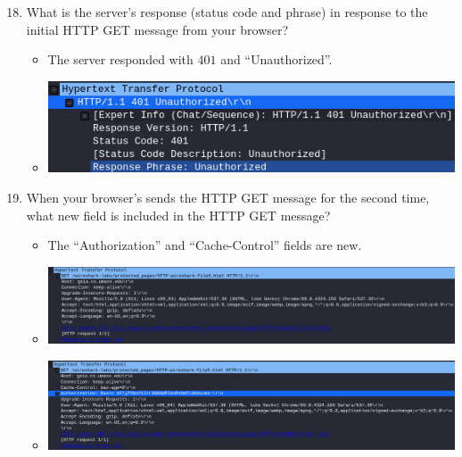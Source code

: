 \documentclass[11pt]{article}
\begin{document}
\begin{enumerate}
  \setcounter{enumi}{17}
\item What is the server’s response (status code and phrase) in response to the
  initial HTTP GET message from your browser?
  \begin{itemize}
  \item The server responded with $401$ and ``Unauthorized''.
  \item \includegraphics[width=\textwidth]{img/ws-auth-1}
  \end{itemize}
\item When your browser’s sends the HTTP GET message for the second time, what
  new field is included in the HTTP GET message?
  \begin{itemize}
  \item The ``Authorization'' and ``Cache-Control'' fields are new.
  \item \includegraphics[width=\textwidth]{img/ws-auth-new-fields-1}
  \item \includegraphics[width=\textwidth]{img/ws-auth-new-fields-2}
  \end{itemize}
\end{enumerate}
\end{document}
